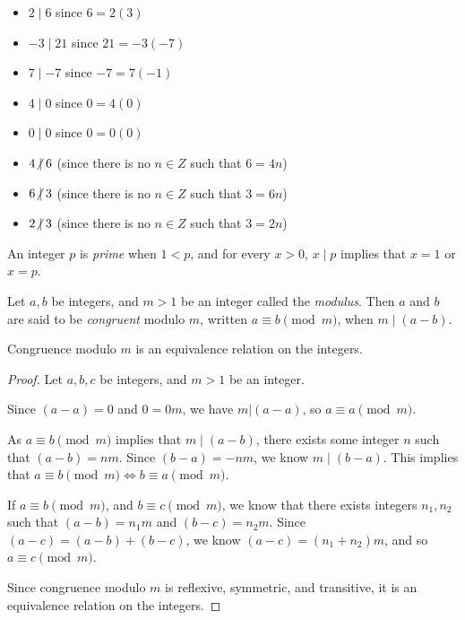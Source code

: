 \documentclass[12pt]{article}
\begin{document}
\begin{exmp}\proofbreak
    \begin{itemize}
        \item $2 \mid 6$ since $6 = 2(3)$
        \item $-3 \mid 21$ since $21 = -3(-7)$
        \item $7 \mid {-7}$ since $-7 = 7(-1)$
        \item $4 \mid 0$ since $0 = 4(0)$
        \item $0 \mid 0$ since $0 = 0(0)$
    \end{itemize}
\end{exmp}

\begin{exmp}\proofbreak
    \begin{itemize}
        \item $4 \centernot\mid 6$ (since there is no $n \in Z$ such that $6 = 4n$)
        \item $6 \centernot\mid 3$ (since there is no $n \in Z$ such that $3 = 6n$)
        \item $2 \centernot\mid 3$ (since there is no $n \in Z$ such that $3 = 2n$)
    \end{itemize}
\end{exmp}

\begin{defn}
    An integer $p$ is \emph{prime} when $1 < p$, and for every $x > 0$, $x \mid p$ implies that $x = 1$ or $x = p$.
\end{defn}

\begin{defn}\label{modular-congruence}
    Let $a, b$ be integers, and $m > 1$ be an integer called the \emph{modulus}. Then $a$ and $b$ are said to be \emph{congruent} modulo $m$, written $a \equiv b \pmod m$, when $m\mid(a - b)$.
\end{defn}

\begin{thm}\label{modular-congruence-equivalence}
    Congruence modulo $m$ is an equivalence relation on the integers.
\end{thm}

\begin{proof} Let $a, b, c$ be integers, and $m > 1$ be an integer.

    Since $(a-a) = 0$ and $0 = 0m$, we have $m|(a-a)$, so $a \equiv a \pmod m$.

    As $a \equiv b \pmod m$ implies that $m\mid(a - b)$, there exists some integer $n$ such that $(a - b) = nm$. Since $(b - a) = -nm$, we know $m\mid(b-a)$. This implies that $a \equiv b \pmod m \iff b \equiv a \pmod m$.

    If $a \equiv b \pmod m$, and $b \equiv c \pmod m$, we know that there exists integers $n_1, n_2$ such that $(a-b) = n_1m$ and $(b-c) = n_2m$. Since $(a-c) = (a-b) + (b-c)$, we know $(a-c) = (n_1 + n_2)m$, and so $a \equiv c \pmod m$.

    Since congruence modulo $m$ is reflexive, symmetric, and transitive, it is an equivalence relation on the integers.
\end{proof}
\end{document}
